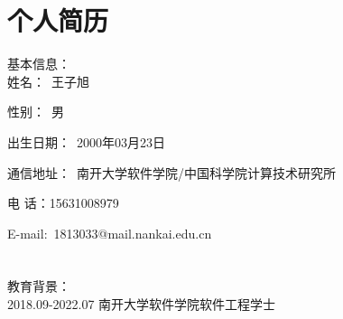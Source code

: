 

\chapter*{个人简历}

\noindent 基本信息：\\

 姓名：~王子旭
 
 性别：~男 

 出生日期：~2000年03月23日

 通信地址：~南开大学软件学院/中国科学院计算技术研究所

 电  话：15631008979

 E-mail:~1813033@mail.nankai.edu.cn \\ \\
\\
教育背景：\\  

2018.09-2022.07 \quad 南开大学\quad 软件学院\quad\quad 软件工程\quad\quad 学士 \\ 
\\

